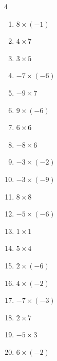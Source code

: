 \begin{multicols}{4}
\begin{enumerate}
  \item $8\times (-1)$
        \phantom{$=-8$}

  \item $4\times 7$
        \phantom{$=28$}

  \item $3\times 5$
        \phantom{$=15$}

  \item $-7\times (-6)$
        \phantom{$=42$}

  \item $-9\times 7$
        \phantom{$=-63$}

  \item $9\times (-6)$
        \phantom{$=-54$}

  \item $6\times 6$
        \phantom{$=36$}

  \item $-8\times 6$
        \phantom{$=-48$}

  \item $-3\times (-2)$
        \phantom{$=6$}

\columnbreak %

  \item $-3\times (-9)$
        \phantom{$=27$}

  \item $8\times 8$
        \phantom{$=64$}

  \item $-5\times (-6)$
        \phantom{$=30$}

  \item $1\times 1$
        \phantom{$=1$}

  \item $5\times 4$
        \phantom{$=20$}

  \item $2\times (-6)$
        \phantom{$=-12$}

  \item $4\times (-2)$
        \phantom{$=-8$}

  \item $-7\times (-3)$
        \phantom{$=21$}

  \item $2\times 7$
        \phantom{$=14$}

  \item $-5\times 3$
        \phantom{$=-15$}

  \item $6\times (-2)$
        \phantom{$=-12$}


\end{enumerate}
\end{multicols}
